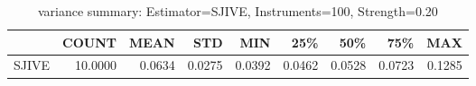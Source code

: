 \begin{table}[ht]
\centering
\caption{variance summary: Estimator=SJIVE, Instruments=100, Strength=0.20}
\begin{tabular}{lrrrrrrrr}
\toprule
 & COUNT & MEAN & STD & MIN & 25\% & 50\% & 75\% & MAX \\
\midrule
SJIVE & 10.0000 & 0.0634 & 0.0275 & 0.0392 & 0.0462 & 0.0528 & 0.0723 & 0.1285 \\
\bottomrule
\end{tabular}
\end{table}
